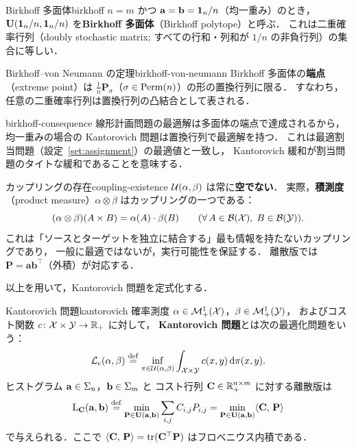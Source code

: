 \begin{definition}{Birkhoff 多面体}{birkhoff}
  $n = m$ かつ $\mathbf{a} = \mathbf{b} = \mathbf{1}_n / n$（均一重み）のとき，
  $\mathbf{U}(\mathbf{1}_n/n, \mathbf{1}_n/n)$ を\textbf{Birkhoff 多面体}（Birkhoff polytope）と呼ぶ．
  これは二重確率行列（doubly stochastic matrix;
  すべての行和・列和が $1/n$ の非負行列）の集合に等しい．
\end{definition}

\begin{theorem}{Birkhoff--von Neumann の定理}{birkhoff-von-neumann}
  Birkhoff 多面体の\textbf{端点}（extreme point）は
  $\frac{1}{n}\mathbf{P}_\sigma$（$\sigma \in \operatorname{Perm}(n)$）の形の置換行列に限る．
  すなわち，任意の二重確率行列は置換行列の凸結合として表される．
\end{theorem}

\begin{remark}{}{birkhoff-consequence}
  線形計画問題の最適解は多面体の端点で達成されるから，
  均一重みの場合の Kantorovich 問題は置換行列で最適解を持つ．
  これは最適割当問題（設定~\ref{set:assignment}）の最適値と一致し，
  Kantorovich 緩和が割当問題のタイトな緩和であることを意味する．
\end{remark}

\begin{remark}{カップリングの存在}{coupling-existence}
  $\mathcal{U}(\alpha, \beta)$ は常に\textbf{空でない}．
  実際，\textbf{積測度}（product measure）$\alpha \otimes \beta$ はカップリングの一つである：
  \[
    (\alpha \otimes \beta)(A \times B) = \alpha(A) \cdot \beta(B)
    \qquad (\forall\, A \in \mathcal{B}(\mathcal{X}), \; B \in \mathcal{B}(\mathcal{Y})).
  \]
  これは「ソースとターゲットを独立に結合する」最も情報を持たないカップリングであり，
  一般に最適ではないが，実行可能性を保証する．
  離散版では $\mathbf{P} = \mathbf{a} \mathbf{b}^\top$（外積）が対応する．
\end{remark}

以上を用いて，Kantorovich 問題を定式化する．

\begin{setting}{Kantorovich 問題}{kantorovich}
  確率測度 $\alpha \in \mathcal{M}_+^1(\mathcal{X})$，$\beta \in \mathcal{M}_+^1(\mathcal{Y})$，
  およびコスト関数 $c \colon \mathcal{X} \times \mathcal{Y} \to \mathbb{R}_+$ に対して，
  \textbf{Kantorovich 問題}とは次の最適化問題をいう：
  \[
    \mathcal{L}_c(\alpha, \beta) \overset{\mathrm{def}}{=}
    \inf_{\pi \in \mathcal{U}(\alpha, \beta)}
    \int_{\mathcal{X} \times \mathcal{Y}} c(x, y) \, \mathrm{d}\pi(x, y).
  \]
  ヒストグラム $\mathbf{a} \in \Sigma_n$，$\mathbf{b} \in \Sigma_m$ と
  コスト行列 $\mathbf{C} \in \mathbb{R}_+^{n \times m}$ に対する離散版は
  \[
    \mathrm{L}_{\mathbf{C}}(\mathbf{a}, \mathbf{b}) \overset{\mathrm{def}}{=}
    \min_{\mathbf{P} \in \mathbf{U}(\mathbf{a}, \mathbf{b})}
    \sum_{i,j} C_{i,j} P_{i,j}
    = \min_{\mathbf{P} \in \mathbf{U}(\mathbf{a}, \mathbf{b})}
    \langle \mathbf{C},\, \mathbf{P} \rangle
  \]
  で与えられる．ここで $\langle \mathbf{C},\, \mathbf{P} \rangle = \operatorname{tr}(\mathbf{C}^\top \mathbf{P})$
  はフロベニウス内積である．
\end{setting}

